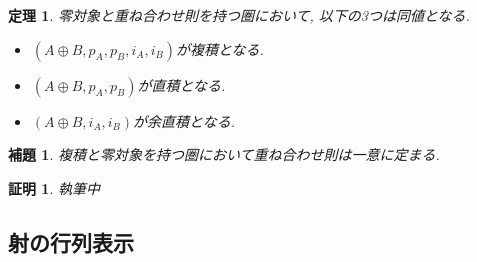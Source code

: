 \documentclass[a4paper,12pt]{ltjsarticle}
\theoremstyle{break}
\newtheorem{lem}[thm]{補題}
\newtheorem{thrm}[thm]{定理}
\newtheorem*{prf}{証明}
\newcommand{\opl}{\oplus}
\numberwithin{equation}{section}
\begin{document}
\begin{thrm}
  零対象と重ね合わせ則を持つ圏において, 以下の3つは同値となる. 
  \begin{itemize}
    \item $(A \opl B, p_A,p_B,i_A,i_B)$が複積となる. 
    \item $(A \opl B, p_A, p_B)$が直積となる. 
    \item $(A \opl B, i_A, i_B)$が余直積となる. 
  \end{itemize}
\end{thrm}

\begin{lem}
  複積と零対象を持つ圏において重ね合わせ則は一意に定まる. 
\end{lem}

\begin{prf}
  執筆中
\end{prf}

\subsection{射の行列表示}
\end{document}
